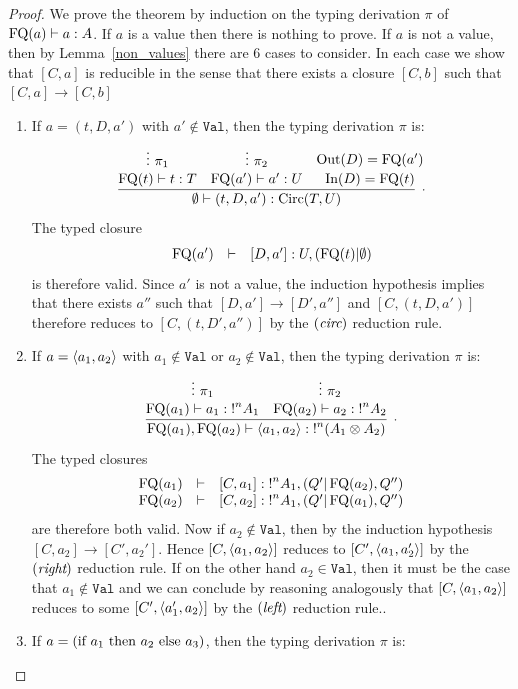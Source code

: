 \documentclass[twoside]{article}
\begin{document}
\begin{proof}
We prove the theorem by induction on the typing derivation $\pi$ of 
$\mathop{\textrm{FQ}}\nolimits(a)\vdash a:A$. If $a$ is a value then there is nothing 
to prove. If $a$ is not a value, then by 
Lemma~\hyperref[non_values]{\ref*{non_values}} there are 6 cases to consider. 
In each case we show that $[C,a]$ is reducible in the sense that there exists a 
closure  $[C,b]$ such that $[C,a]\to[C,b]$
\begin{enumerate}
  \item If $a=(t,D,a')$ with $a'\notin \mathtt{Val}$, then the typing derivation 
  $\pi$ is:
  \[
  \infer[.]{\emptyset\entails (t,D,a'):\Circ(T,U)}{
    \deduce[]{\FQ(t)\entails t:T}{
      \vdots ~\pi_1
    }
    &
    \deduce[]{\FQ(a')\entails a':U}{
      \vdots ~\pi_2     
    }
    &
    \deduce[]{\In(D)=\FQ(t)}{
      \Out(D)=\FQ(a')
    }
  }   
  \]
  The typed closure 
  \[
  \begin{array}{rcl}
  \mathop{\textrm{FQ}}\nolimits(a') & \vdash & [D,a']:U,(\mathop{\textrm{FQ}}\nolimits(t)|\emptyset)
  \end{array}
  \]
  is therefore valid. Since $a'$ 
  is not a value, the induction hypothesis implies that there exists $a''$ such 
  that $[D,a']\to [D',a'']$ and $[C,(t,D,a')]$ therefore reduces to 
  $[C,(t,D',a'')]$ by the $(\textit{circ})$ reduction rule.
  \item If $a=\langle a_1,a_2\rangle$ with $a_1\notin \mathtt{Val}$ or $a_2\notin \mathtt{Val}$,
  then the typing derivation $\pi$ is:
  \[
  \infer[.]{\FQ(a_1),\FQ(a_2)\entails \p{a_1,a_2}:{!}^n(A_1\x A_2)}{
    \deduce[]{\FQ(a_1)\entails a_1:{!}^nA_1}{
      \vdots~\pi_1
    }
    & 
    \deduce[]{\FQ(a_2)\entails a_2:{!}^nA_2}{
      \vdots~\pi_2
    }
  }
  \] 
  The typed closures 
  \[
  \begin{array}{rcl}
  \mathop{\textrm{FQ}}\nolimits(a_1) & \vdash & [C,a_1]:{!}^nA_1,(Q'|\mathop{\textrm{FQ}}\nolimits(a_2),Q'')\\
  \mathop{\textrm{FQ}}\nolimits(a_2) & \vdash & [C,a_2]:{!}^nA_1, (Q'|\mathop{\textrm{FQ}}\nolimits(a_1),Q'')
  \end{array}
  \]
  are therefore both valid. 
  Now if $a_2\notin\mathtt{Val}$, then by the induction hypothesis 
  $[C,a_2]\to[C',a_2']$. Hence $[C,\langle a_1,a_2\rangle]$ reduces to $[C',\langle a_1,a_2'\rangle]$ 
  by the $(\textit{right})$ reduction rule.
  If on the other hand $a_2\in\mathtt{Val}$, then it must be the case that $a_1\notin\mathtt{Val}$ 
  and we can conclude by reasoning analogously that $[C,\langle a_1,a_2\rangle]$ reduces to 
  some $[C',\langle a_1',a_2\rangle]$ by the $(\textit{left})$ reduction rule.. 
  \item If $a=(\textrm{\rm if}~ a_1 ~\textrm{\rm then}~ a_2 ~\textrm{\rm else}~ a_3)$, then the typing derivation $\pi$ is:

\end{enumerate}
\end{proof}
\end{document}
